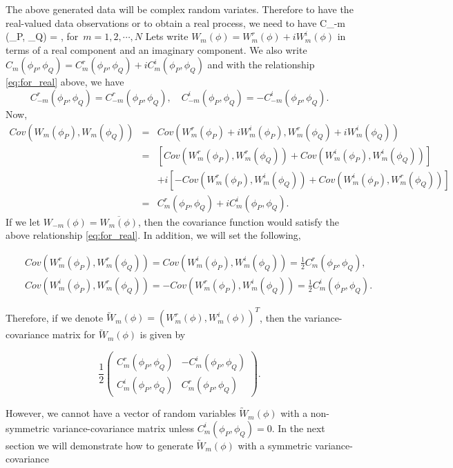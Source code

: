 	The above generated data will be complex random variates. Therefore to have the real-valued data observations or to obtain a real process, we need to have
	\beq \label{eq:for_real}
	C_{-m} (\phi_P, \phi_Q) = , \quad \mbox{for $m = 1, 2, \cdots, N$}
	\eeq
	Lets write $W_m(\phi) = W_{m}^{r}(\phi) + i W_{m}^i(\phi)$ in terms of a real component and an imaginary component. We also write $C_m(\phi_P, \phi_Q) = C_m^r(\phi_P, \phi_Q) + i C_m^i(\phi_P, \phi_Q)$
	and with the relationship \ref{eq:for_real} above, we have
	\[
		C_{-m}^r(\phi_P, \phi_Q) = C_{-m}^r(\phi_P, \phi_Q), \quad C_{-m}^i(\phi_P, \phi_Q) = - C_{-m}^i(\phi_P, \phi_Q).
	\]
	Now,
	\begin{eqnarray*}
		Cov(W_m(\phi_P), {W_m(\phi_Q)}) &=& Cov(W_m^r(\phi_P) + iW_m^i(\phi_P), W_m^r(\phi_Q) + i W_m^i(\phi_Q)) \\
		&=& \left[Cov(W_m^r(\phi_P), W_m^r(\phi_Q)) + Cov(W_m^i(\phi_P), W_m^i(\phi_Q))\right] \\
		& & + i\left[- Cov(W_m^r(\phi_P), W_m^i(\phi_Q)) + Cov(W_m^i(\phi_P), W_m^r(\phi_Q))\right] \\
		&=& C_m^r(\phi_P, \phi_Q) + i C_m^i(\phi_P, \phi_Q).
	\end{eqnarray*}
	If we let $W_{-m}(\phi) = \overline{W_m(\phi)}$, then the covariance function would satisfy the above relationship \ref{eq:for_real}. In addition, we will set the following,
		
	\begin{eqnarray} \label{real_cov}
		& & Cov(W_m^r(\phi_P), W_m^r(\phi_Q)) = Cov(W_m^i(\phi_P), W_m^i(\phi_Q)) = \frac{1}{2}C_m^r(\phi_P, \phi_Q) \label{real_cov},
	\end{eqnarray}
	\begin{eqnarray} \label{im_cov}
		& & Cov(W_m^i(\phi_P), W_m^r(\phi_Q)) = - Cov(W_m^r(\phi_P), W_m^i(\phi_Q)) = \frac{1}{2}C_m^i(\phi_P, \phi_Q).
	\end{eqnarray}
		
	Therefore, if we denote $\utilde{W}_m(\phi) = (W_m^r(\phi), W_m^i(\phi))^T$, then the variance-covariance matrix for $\utilde{W}_m(\phi)$ is given by
		
	\[
		\frac{1}{2}\left(\begin{array}{ll}
		C_m^r(\phi_P, \phi_Q)& -C_m^i(\phi_P, \phi_Q) \\
		C_m^i(\phi_P, \phi_Q) & C_m^r(\phi_P, \phi_Q)
		\end{array}
		\right).
	\]
		
	However, we cannot have a vector of random variables $\utilde{W}_m(\phi)$ with a non-symmetric variance-covariance matrix unless $C_m^i(\phi_P, \phi_Q) = 0$. In the next section we will demonstrate how to generate $\utilde{W}_m(\phi)$ with a symmetric variance-covariance\\
		
